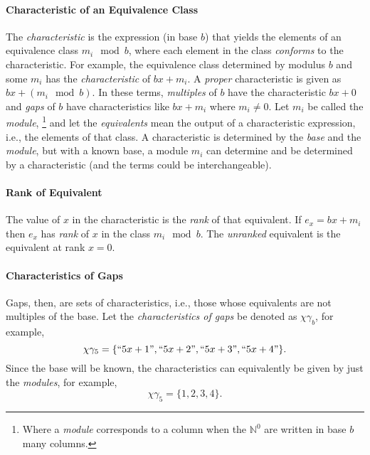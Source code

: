 \documentclass{article}
\begin{document}
\paragraph{Characteristic of an Equivalence Class}	The \emph{characteristic} is the expression (in base $b$) that yields the elements of an equivalence class $m_i \mod b$, where each element in the class \emph{conforms} to the characteristic. For example, the equivalence class determined by modulus $b$ and some $m_i$ has the \emph{characteristic} of $bx+m_i$. A \emph{proper} characteristic is given as $bx+(m_i \mod b)$. In these terms, \emph{multiples} of $b$ have the characteristic $bx+0$ and \emph{gaps} of $b$ have characteristics like $bx+m_i$ where $m_i \neq 0$. Let $m_i$ be called the \emph{module}, \footnote{Where a \emph{module} corresponds to a column when the $\mathbb{N}^{0}$ are written in base $b$ many columns.} and let the \emph{equivalents} mean the output of a characteristic expression, i.e., the elements of that class. A characteristic is determined by the \emph{base} and the \emph{module}, but with a known base, a module $m_i$ can determine and be determined by a characteristic (and the terms could be interchangeable).

\paragraph{Rank of Equivalent}	The value of $x$ in the characteristic is the \emph{rank} of that equivalent. If $e_x = bx+m_i$ then $e_x$ has \emph{rank} of $x$ in the class $m_i \mod b$. The \emph{unranked} equivalent is the equivalent at rank $x=0$.

\paragraph{Characteristics of Gaps}	 Gaps, then, are sets of characteristics, i.e., those whose equivalents are not multiples of the base. Let the \emph{characteristics of gaps} be denoted as $\chi \gamma_b$, for example,
	\begin{equation*}\chi \gamma_5 = \{ ``5x+1", ``5x+2", ``5x+3", ``5x+4" \}.\end{equation*}
Since the base will be known, the characteristics can equivalently be given by just the \emph{modules}, for example,
	\begin{equation*}\chi \gamma_5 = \{ 1, 2, 3, 4 \}.\end{equation*}
\end{document}
